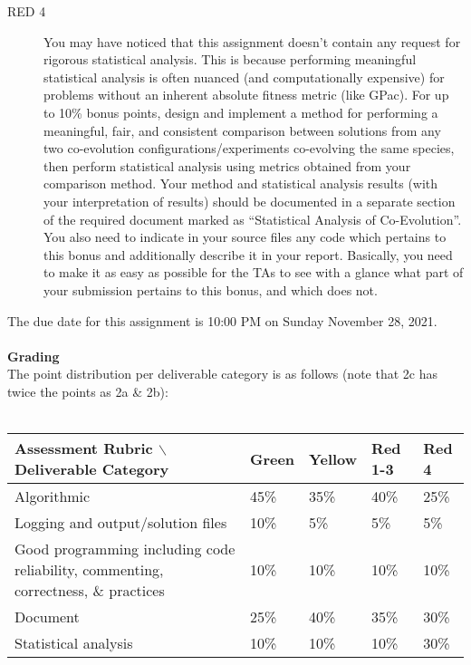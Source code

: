 \documentclass{article}
\begin{document}
\begin{description}
\item[RED 4] You may have noticed that this assignment doesn't contain any request for rigorous statistical analysis. This is because performing meaningful statistical analysis is often nuanced (and computationally expensive) for problems without an inherent absolute fitness metric (like GPac). For up to 10\% bonus points, design and implement a method for performing a meaningful, fair, and consistent comparison between solutions from any two co-evolution configurations/experiments co-evolving the same species, then perform statistical analysis using metrics obtained from your comparison method. Your method and statistical analysis results (with your interpretation of results) should be documented in a separate section of the required document marked as ``Statistical Analysis of Co-Evolution''. You also need to indicate in your source files any code which pertains to this bonus and additionally describe it in your report. Basically, you need to make it as easy as possible for the TAs to see with a glance what part of your submission pertains to this bonus, and which does not.

\end{description}
The due date for this assignment is 10:00 PM on Sunday November 28, 2021.
\\
\\
\textbf{Grading}\\
The point distribution per deliverable category is as follows (note that 2c has twice the points as 2a \& 2b): \\
\\
\begin{tabular}{p{20em}|l|l|l|l|}
  Assessment Rubric $\backslash$ Deliverable Category & Green       & Yellow        & Red 1-3 & Red 4\\ \hline \hline  
  Algorithmic                                                             & 45\% & 35\% & 40\% & 25\%\\
  \hline Logging and output/solution files                      & 10\% &  5\%  & 5\% & 5\%\\
  \hline Good programming including code reliability, commenting, correctness, \& practices       & 10\% & 10\% & 10\% & 10\%\\
  \hline Document                                                      & 25\%  & 40\% & 35\% & 30\%\\
  \hline Statistical analysis                                           & 10\%  & 10\% & 10\% & 30\%\\
\end{tabular}
\end{document}
